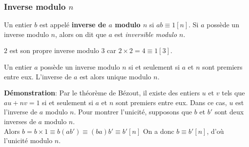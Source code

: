 



\subsubsection{Inverse modulo $n$}


\begin{dfn}
Un entier $b$ est appelé \textbf{inverse de $a$ modulo $n$} si $ab \equiv 1 [n]$. Si $a$ possède un inverse modulo $n$, alors on dit que $a$ est \textit{inversible modulo $n$}.
\end{dfn}


\begin{ex}
$2$ est son propre inverse modulo $3$ car $2 \times 2 = 4 \equiv 1 [3]$.
\end{ex}

\begin{pro}
Un entier $a$ possède un inverse modulo $n$ si et seulement si $a$ et $n$ sont premiers entre eux. L'inverse de $a$ est alors unique modulo $n$.
\end{pro}

\textbf{Démonstration}:
\newline
Par le théorème de Bézout, il existe des entiers $u$ et $v$ tels que $au + nv = 1$ si et seulement si $a$ et $n$ sont premiers entre eux. Dans ce cas, $u$ est l'inverse de $a$ modulo $n$. 
\newline
Pour montrer l'unicité, supposons que $b$ et $b'$ sont deux inverses de $a$ modulo $n$. \\
Alors $b=b\times 1\equiv b(ab')\equiv (ba)b'\equiv b'[n]$
\newline
On a donc $b\equiv b'[n]$, d’où l’unicité modulo $n$.